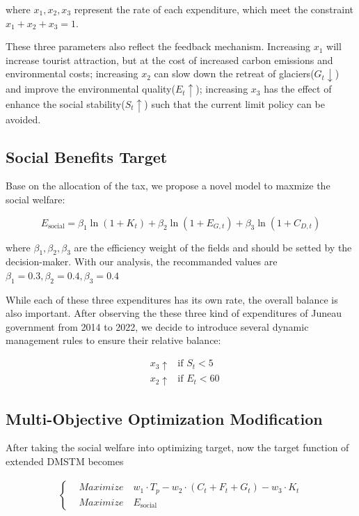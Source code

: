 \documentclass{mcmthesis}
\begin{document}
where $x_1, x_2, x_3$ represent the rate of each expenditure, which meet the constraint $x_1 + x_2 + x_3 = 1$.

These three parameters also reflect the feedback mechanism. Increasing $x_1$ will increase tourist attraction, 
but at the cost of increased carbon emissions and environmental costs; increasing $x_2$ can slow down the retreat
of glaciers($G_t \downarrow$) and improve the environmental quality($E_t \uparrow$); increasing $x_3$ has the effect of
enhance the social stability($S_t\uparrow$) such that the current limit policy can be avoided.

\subsection{Social Benefits Target}
Base on the allocation of the tax, we propose a novel model to maxmize the social welfare:

\begin{equation}
  E_{\text{social}} = \beta_1 \ln(1+K_t) + \beta_2 \ln(1 + E_{G,t}) + \beta_3 \ln(1 + C_{D,t})
\end{equation}

where $\beta_1, \beta_2, \beta_3$ are the efficiency weight of the fields and should be setted by the decision-maker.
With our analysis, the recommanded values are $\beta_1=0.3, \beta_2=0.4, \beta_3=0.4$

While each of these three expenditures has its own rate, the overall balance is also important. After observing the 
these three kind of expenditures of Juneau government from 2014 to 2022, we decide to introduce several 
dynamic management rules to ensure their relative balance:

\begin{equation}
\begin{aligned}
  & x_3\uparrow & \text{if } S_t < 5 \\
  & x_2\uparrow & \text{if } E_t < 60  
\end{aligned}
\end{equation}

\subsection{Multi-Objective Optimization Modification}
After taking the social welfare into optimizing target, now the target function of extended DMSTM becomes 

\begin{align}
\left\{
  \begin{aligned}
    & Maximize \quad w_1 \cdot T_p - w_2 \cdot (C_t + F_t + G_t) - w_3 \cdot K_t \\ 
    & Maximize \quad E_{\text{social}}
  \end{aligned}
\right.
\end{align}
\end{document}
